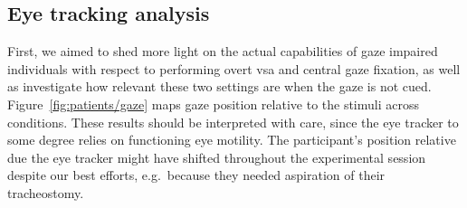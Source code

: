 \subsection{Eye tracking analysis}
\label{sec:patients/outcomes/gaze}

First, we aimed to shed more light on the actual capabilities of gaze impaired
individuals with respect to performing overt \ac{vsa} and central gaze
fixation, as well as investigate how relevant these two settings are when the
gaze is not cued.
Figure~\ref{fig:patients/gaze} maps gaze position relative to the stimuli
across conditions.
These results should be interpreted with care, since the eye tracker to some
degree relies on functioning eye motility.
The participant's position
relative due the eye tracker might have shifted throughout the experimental
session despite our best efforts, e.g.\ because they needed aspiration of their
tracheostomy.



